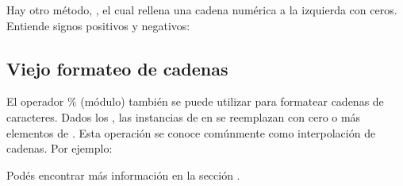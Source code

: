 \documentclass[a5paper,10pt,spanish]{sphinxmanual}
\begin{document}
\sphinxAtStartPar
Hay otro método, , el cual rellena una cadena numérica a la izquierda con ceros. Entiende signos positivos y negativos:

\begin{sphinxVerbatim}[commandchars=\\\{\}]
\end{sphinxVerbatim}


\subsection{Viejo formateo de cadenas}
\label{\detokenize{tutorial/inputoutput:old-string-formatting}}
\sphinxAtStartPar
El operador \% (módulo) también se puede utilizar para formatear cadenas de caracteres. Dados los , las instancias de \sphinxcode{\sphinxupquote{\%}} en  se reemplazan con cero o más elementos de . Esta operación se conoce comúnmente como interpolación de cadenas. Por ejemplo:

\begin{sphinxVerbatim}[commandchars=\\\{\}]
 
  
\end{sphinxVerbatim}

\sphinxAtStartPar
Podés encontrar más información en la sección .
\end{document}
